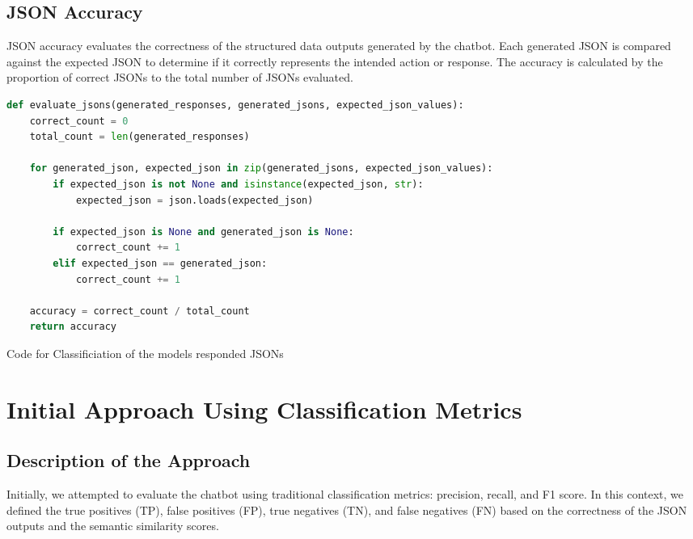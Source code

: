 \subsection{JSON Accuracy}

JSON accuracy evaluates the correctness of the structured data outputs generated by the chatbot. Each generated JSON is compared against the expected JSON to determine if it correctly represents the intended action or response. The accuracy is calculated by the proportion of correct JSONs to the total number of JSONs evaluated.

\begin{Listing}
    \begin{lstlisting}[language=Python]
def evaluate_jsons(generated_responses, generated_jsons, expected_json_values):
    correct_count = 0
    total_count = len(generated_responses)

    for generated_json, expected_json in zip(generated_jsons, expected_json_values):
        if expected_json is not None and isinstance(expected_json, str):
            expected_json = json.loads(expected_json)
        
        if expected_json is None and generated_json is None:
            correct_count += 1
        elif expected_json == generated_json:
            correct_count += 1

    accuracy = correct_count / total_count
    return accuracy
  \end{lstlisting}
    \caption{Code for Classificiation of the models responded JSONs}
    \label{lst:similarity}
\end{Listing}

\section{Initial Approach Using Classification Metrics}

\subsection{Description of the Approach}

Initially, we attempted to evaluate the chatbot using traditional classification metrics: precision, recall, and F1 score. In this context, we defined the true positives (TP), false positives (FP), true negatives (TN), and false negatives (FN) based on the correctness of the JSON outputs and the semantic similarity scores.

\begin{lstlisting}[language=Python, caption=Classification Metrics]

\end{lstlisting}

